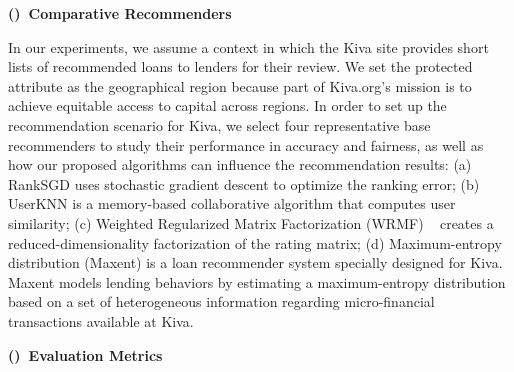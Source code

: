 

\vspace{0.25cm}
\noindent \textbf{()~Comparative Recommenders}
\vspace{0.25cm}

In our experiments, we assume a context in which the Kiva site provides short lists of recommended loans to lenders for their review. We set the protected attribute as the geographical region because part of Kiva.org's mission is to achieve equitable access to capital across regions. In order to set up the recommendation scenario for Kiva, we select four representative base recommenders to study their performance in accuracy and fairness, as well as how our proposed algorithms can influence the recommendation results: (a) RankSGD \cite{pmlr-v18-jahrer12b} uses stochastic gradient descent to optimize the ranking error; (b) UserKNN \cite{resnick1997recommender} is a memory-based collaborative algorithm that computes user similarity; (c) Weighted Regularized Matrix Factorization (WRMF) ~\cite{hu2008collaborative} creates a reduced-dimensionality factorization of the rating matrix; (d) Maximum-entropy distribution (Maxent) \cite{choo2014gather} is a loan recommender system specially designed for Kiva. Maxent models lending behaviors by estimating a maximum-entropy distribution based on a set of heterogeneous information regarding micro-financial transactions available at Kiva.


\vspace{0.25cm}
\noindent \textbf{()~Evaluation Metrics}
\vspace{0.25cm}

